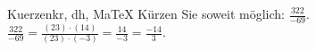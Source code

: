 \begin{MAufgabe}{Kuerzen}{kr, dh, MaTeX}
K\"urzen Sie soweit m\"oglich: $\frac{322}{-69}$.\\ 
\ifLsg\MLoesung
\quad $\frac{322}{-69}=\frac{(23)\cdot(14)}{(23)\cdot(-3)}=\frac{14}{-3}=\frac{-14}{3}$.\else\relax\fi
 \end{MAufgabe}